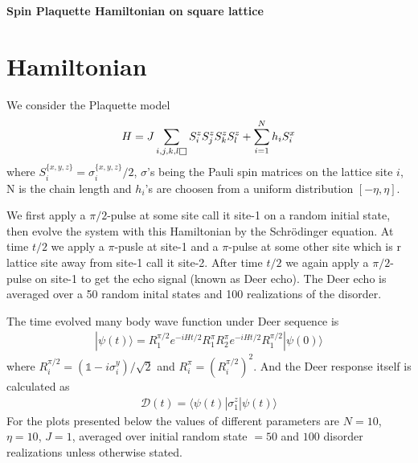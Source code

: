 \documentclass[a4paper]{article}
\def\msquare{\mathord{\scalerel*{\Box}{gX}}}
\begin{document}
\begin{titlepage}
\newcommand{\HRule}{\rule{\linewidth}{0.5mm}} 

\center

{ \huge \bfseries Spin Plaquette Hamiltonian on square lattice}\\[0.4cm] 

\vfill

\end{titlepage}


\tableofcontents
\newpage
\listoffigures

\newpage
\section{Hamiltonian}
We consider the Plaquette model
\begin{eqnarray}
H = J\sum_{i,j,k,l \msquare} {S_i^z S_{j}^z S_k^z S_{l}^z} + \sum_{i=1}^{N} h_i S_i^x
\end{eqnarray}
where $S_i^{\{x,y,z\}}=\sigma_i^{\{x,y,z\}}/2$, $\sigma$'s being the Pauli spin matrices on the lattice site $i$, N is the chain length and $h_i$'s are choosen from a uniform distribution $[-\eta,\eta]$.

We first apply a $\pi/2$-pulse at some site call it site-1 on a random initial state, then evolve the system with this Hamiltonian by the Schr\"odinger equation. At time $t/2$ we apply a $\pi$-pusle at site-1 and a $\pi$-pulse at some other site which is r lattice site away from site-1 call it site-2. After time $t/2$ we again apply a $\pi/2$-pulse on site-1 to get the echo signal (known as Deer echo). The Deer echo is averaged over a 50 random inital states and 100 realizations of the disorder.

The time evolved many body wave function under Deer sequence is
\begin{eqnarray}
|\psi(t)\rangle = R_1^{\pi/2} e^{-iHt/2} R_1^{\pi} R_2^{\pi} e^{-iHt/2} R_1^{\pi/2} |\psi(0)\rangle 
\end{eqnarray}
where $R_i^{\pi/2} = (\mathds{1}-i\sigma_i^y)/\sqrt 2$ and $R_i^{\pi} = (R_i^{\pi/2})^2$. And the Deer response itself is calculated as 
\begin{eqnarray}
\mathcal{D}(t) = \langle \psi(t) | \sigma_1^z | \psi(t) \rangle 
\end{eqnarray}
For the plots presented below the values of different parameters are $N=10$, $\eta=10$, $J=1$, averaged over initial random state $=50$ and $100$ disorder realizations unless otherwise stated.
\end{document}
